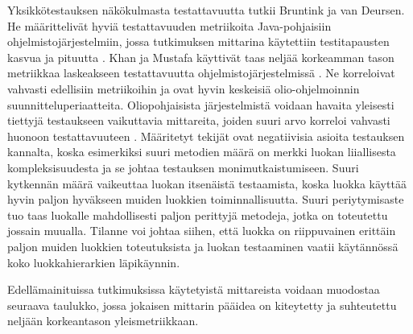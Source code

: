 \documentclass[finnish]{tktltiki2}
\numberwithin{table}{section}
\theoremstyle{definition}
\theoremstyle{remark}
\begin{document}
Yksikkötestauksen näkökulmasta testattavuutta tutkii Bruntink ja van Deursen. He määrittelivät hyviä testattavuuden metriikoita Java-pohjaisiin ohjelmistojärjestelmiin, jossa tutkimuksen mittarina käytettiin testitapausten kasvua ja pituutta \citep{Bruntink:2004}. Khan ja Mustafa käyttivät taas neljää korkeamman tason metriikkaa laskeakseen testattavuutta ohjelmistojärjestelmissä \citep{Khan:2009:MBT:1507195.1507204}. Ne korreloivat vahvasti edellisiin metriikoihin ja ovat hyvin keskeisiä olio-ohjelmoinnin suunnitteluperiaatteita. Oliopohjaisista järjestelmistä voidaan havaita yleisesti tiettyjä testaukseen vaikuttavia mittareita, joiden suuri arvo korreloi vahvasti huonoon testattavuuteen \citep{Dubey:2011:AMM:2020976.2020983}. Määritetyt tekijät ovat negatiivisia asioita testauksen kannalta, koska esimerkiksi suuri metodien määrä on merkki luokan liiallisesta kompleksisuudesta ja se johtaa testauksen monimutkaistumiseen. Suuri kytkennän määrä vaikeuttaa luokan itsenäistä testaamista, koska luokka käyttää hyvin paljon hyväkseen muiden luokkien toiminnallisuutta. Suuri periytymisaste tuo taas luokalle mahdollisesti paljon perittyjä metodeja, jotka on toteutettu jossain muualla. Tilanne voi johtaa siihen, että luokka on riippuvainen erittäin paljon muiden luokkien toteutuksista ja luokan testaaminen vaatii käytännössä koko luokkahierarkien läpikäynnin. 

Edellämainituissa tutkimuksissa käytetyistä mittareista voidaan muodostaa seuraava taulukko, jossa jokaisen mittarin pääidea on kiteytetty ja suhteutettu neljään korkeantason yleismetriikkaan.

\begin{table}[ht]
\centering
	\setlength{\extrarowheight}{4pt}%
\end{table}
\end{document}
